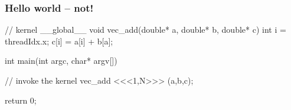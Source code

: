 \begin{frame}[fragile]
%
  \frametitle{Hello world -- not!}
  \label{slide:hello-world-cuda}
%
  \begin{C}
// kernel
__global__ void vec_add(double* a, double* b, double* c) {
    int i = threadIdx.x;
    c[i] = a[i] + b[a];
}

int main(int argc, char* argv[]) {
  // invoke the kernel
  vec_add <<<1,N>>> (a,b,c);

  return 0;
}
  \end{C}
%
\end{frame}

